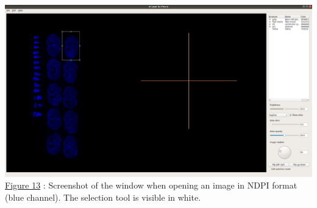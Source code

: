 \documentclass[a4paper,12pt]{report}
\begin{document}
\begin{center} \includegraphics[scale=0.23]{ROITool.png}
\underline{Figure 13} : Screenshot of the window when opening an image in NDPI format (blue channel). The selection tool is visible in white. \vspace{1\baselineskip}
\end{center}
\end{document}
